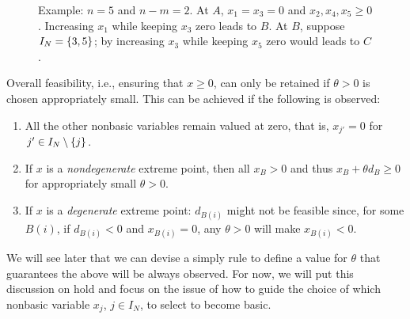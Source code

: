 \begin{figure}[h]
	\caption{Example: $n = 5$ and $n-m = 2$. At $A$, $x_1 = x_3 = 0$ and $x_2, x_4, x_5 \geq 0$. Increasing $x_1$ while keeping $x_3$ zero leads to $B$. At $B$, suppose $I_N = \left\{ 3,5 \right \}$; by increasing $x_3$ while keeping $x_5$ zero would leads to $C$.} \label{p1c3:fig:adjacent_vertices}
\end{figure}

Overall feasibility, i.e., ensuring that $x \ge 0$, can only be retained if $\theta > 0$ is chosen appropriately small. This can be achieved if the following is observed:
%
\begin{enumerate}
	\item All the other nonbasic variables remain valued at zero, that is, $x_{j'} = 0$ for $j' \in I_N \setminus \left\{ j \right \}$.	
	\item If $x$ is a \emph{nondegenerate} extreme point, then all $x_B > 0$ and thus $x_B + \theta d_B \geq 0$ for appropriately small $\theta > 0$. 
	\item If $x$ is a \emph{degenerate} extreme point: $d_{B(i)}$ might not be feasible since, for some $B(i)$, if $d_{B(i)} < 0$ and $x_{B(i)} = 0$, any $\theta > 0$ will make $x_{B(i)} < 0$.
\end{enumerate}
%
We will see later that we can devise a simply rule to define a value for $\theta$ that guarantees the above will be always observed. For now, we will put this discussion on hold and focus on the issue of how to guide the choice of which nonbasic variable $x_j$, $j \in I_N$, to select to become basic.


